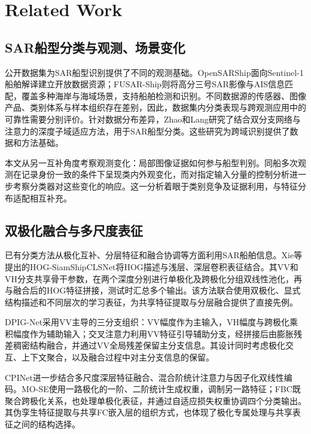 \section{Related Work}
\label{sec:related}

\subsection{SAR船型分类与观测、场景变化}

公开数据集为SAR船型识别提供了不同的观测基础。OpenSARShip面向Sentinel-1船舶解译建立开放数据资源\cite{huang2018opensarship}；FUSAR-Ship则将高分三号SAR影像与AIS信息匹配，覆盖多种海岸与海域场景，支持船舶检测和识别\cite{hou2020fusar}。不同数据源的传感器、图像产品、类别体系与样本组织存在差别，因此，数据集内分类表现与跨观测应用中的可靠性需要分别评价。针对数据分布差异，Zhao和Lang研究了结合双分支网络与注意力的深度子域适应方法，用于SAR船型分类\cite{zhao2022dsan}。这些研究为跨域识别提供了数据和方法基础。

本文从另一互补角度考察观测变化：局部图像证据如何参与船型判别。同船多次观测在记录身份一致的条件下呈现类内外观变化，而对指定输入分量的控制分析进一步考察分类器对这些变化的响应。这一分析着眼于类别竞争及证据利用，与特征分布适配相互补充。

\subsection{双极化融合与多尺度表征}

已有分类方法从极化互补、分层特征和融合协调等方面利用SAR船舶信息。Xie等提出的HOG-SiamShipCLSNet将HOG描述与浅层、深层卷积表征结合\cite{xie2023hogsiam}。其VV和VH分支共享骨干参数，在两个深度分别进行单极化及跨极化分组双线性池化，再与融合后的HOG特征拼接，测试时汇总多个输出。该方法联合使用双极化、显式结构描述和不同层次的学习表征，为共享特征提取与分层融合提供了直接先例。

DPIG-Net采用VV主导的三分支组织\cite{shao2023dpig}：VV幅度作为主输入，VH幅度与跨极化乘积幅度作为辅助输入；交叉注意力利用VV特征引导辅助分支，经拼接后由膨胀残差稠密结构融合，并通过VV全局残差保留主分支信息。其设计同时考虑极化交互、上下文聚合，以及融合过程中对主分支信息的保留。

CPINet进一步结合多尺度深层特征融合、混合阶统计注意力与因子化双线性编码\cite{he2024cpinet}。MO-SE使用一路极化的一阶、二阶统计生成权重，调制另一路特征；FBC既聚合跨极化关系，也处理单极化表征，并通过自适应损失权重协调四个分类输出。其伪孪生特征提取与共享FC嵌入层的组织方式，也体现了极化专属处理与共享表征之间的结构选择。

